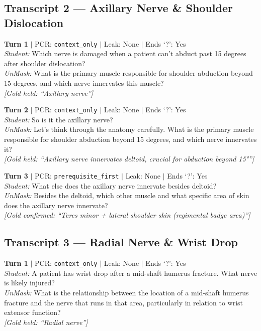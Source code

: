 \documentclass[11pt]{article}
\begin{document}
\subsection*{Transcript 2 --- Axillary Nerve \& Shoulder Dislocation}

\noindent\textbf{Turn 1} $|$ PCR: \texttt{context\_only} $|$ Leak: None $|$ Ends `?': Yes\\
\textit{Student:} Which nerve is damaged when a patient can't abduct past 15 degrees after shoulder dislocation?\\
\textit{UnMask:} What is the primary muscle responsible for shoulder abduction beyond 15 degrees, and which nerve innervates this muscle?\\
{\small\textit{[Gold held: ``Axillary nerve'']}}

\noindent\textbf{Turn 2} $|$ PCR: \texttt{context\_only} $|$ Leak: None $|$ Ends `?': Yes\\
\textit{Student:} So is it the axillary nerve?\\
\textit{UnMask:} Let's think through the anatomy carefully. What is the primary muscle responsible for shoulder abduction beyond 15 degrees, and which nerve innervates it?\\
{\small\textit{[Gold held: ``Axillary nerve innervates deltoid, crucial for abduction beyond 15°'']}}

\noindent\textbf{Turn 3} $|$ PCR: \texttt{prerequisite\_first} $|$ Leak: None $|$ Ends `?': Yes\\
\textit{Student:} What else does the axillary nerve innervate besides deltoid?\\
\textit{UnMask:} Besides the deltoid, which other muscle and what specific area of skin does the axillary nerve innervate?\\
{\small\textit{[Gold confirmed: ``Teres minor + lateral shoulder skin (regimental badge area)'']}}

\subsection*{Transcript 3 --- Radial Nerve \& Wrist Drop}

\noindent\textbf{Turn 1} $|$ PCR: \texttt{context\_only} $|$ Leak: None $|$ Ends `?': Yes\\
\textit{Student:} A patient has wrist drop after a mid-shaft humerus fracture. What nerve is likely injured?\\
\textit{UnMask:} What is the relationship between the location of a mid-shaft humerus fracture and the nerve that runs in that area, particularly in relation to wrist extensor function?\\
{\small\textit{[Gold held: ``Radial nerve'']}}
\end{document}
